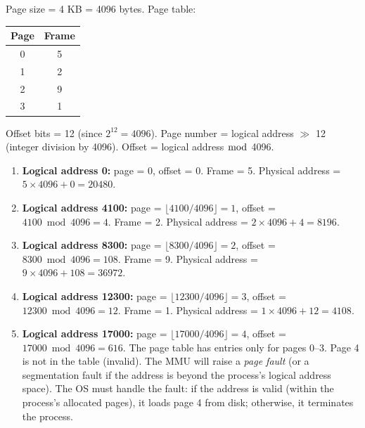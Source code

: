 \documentclass[11pt]{article}
\begin{document}
\begin{corrige}
Page size = 4 KB = 4096 bytes.  
Page table: 
\begin{center}
\begin{tabular}{|c|c|}
\hline
Page & Frame \\
\hline
0 & 5 \\
1 & 2 \\
2 & 9 \\
3 & 1 \\
\hline
\end{tabular}
\end{center}
Offset bits = 12 (since $2^{12}=4096$). Page number = logical address $\gg$ 12 (integer division by 4096). Offset = logical address $\bmod$ 4096.

\begin{enumerate}
\item \textbf{Logical address 0:} page = 0, offset = 0. Frame = 5. Physical address = $5 \times 4096 + 0 = 20480$.
\item \textbf{Logical address 4100:} page = $\lfloor 4100/4096 \rfloor = 1$, offset = $4100 \bmod 4096 = 4$. Frame = 2. Physical address = $2 \times 4096 + 4 = 8196$.
\item \textbf{Logical address 8300:} page = $\lfloor 8300/4096 \rfloor = 2$, offset = $8300 \bmod 4096 = 108$. Frame = 9. Physical address = $9 \times 4096 + 108 = 36972$.
\item \textbf{Logical address 12300:} page = $\lfloor 12300/4096 \rfloor = 3$, offset = $12300 \bmod 4096 = 12$. Frame = 1. Physical address = $1 \times 4096 + 12 = 4108$.
\item \textbf{Logical address 17000:} page = $\lfloor 17000/4096 \rfloor = 4$, offset = $17000 \bmod 4096 = 616$. The page table has entries only for pages 0–3. Page 4 is not in the table (invalid). The MMU will raise a \emph{page fault} (or a segmentation fault if the address is beyond the process's logical address space). The OS must handle the fault: if the address is valid (within the process's allocated pages), it loads page 4 from disk; otherwise, it terminates the process.
\end{enumerate}
\end{corrige}
\end{document}
